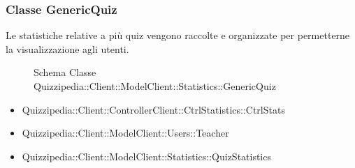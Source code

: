 \subsubsection{Classe GenericQuiz}
Le statistiche relative a più quiz vengono raccolte e organizzate per permetterne la visualizzazione agli utenti.
\begin{figure}[H]
\centering
\noindent{}
\caption[Schema Classe GenericQuiz]{Schema Classe Quizzipedia::Client::ModelClient::Statistics::GenericQuiz}
\end{figure}
\begin{itemize}
\item Quizzipedia::Client::ControllerClient::CtrlStatistics::CtrlStats
\item Quizzipedia::Client::ModelClient::Users::Teacher
\end{itemize}
\begin{itemize}
\item Quizzipedia::Client::ModelClient::Statistics::QuizStatistics
\end{itemize}
